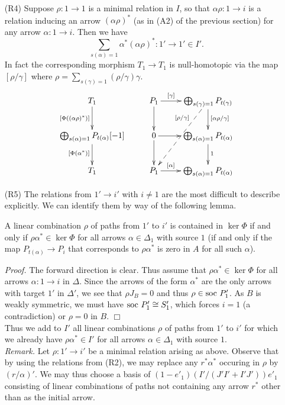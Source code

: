 \documentclass{amsart}
\begin{document}
\begin{itemize}
\vspace{2mm}
\item[(R4)] Suppose $\rho: 1 \rightarrow 1$ is a minimal relation in $I$, so that $\alpha \rho : 1 \rightarrow i$ is a relation inducing an arrow $(\alpha \rho)^*$ (as in (A2) of the previous section) for any arrow $\alpha : 1 \rightarrow i$.  Then we have $$\sum_{s(\alpha)=1} \alpha^*(\alpha \rho)^* : 1' \rightarrow 1'  \in I'.$$  In fact the corresponding morphism $T_1 \rightarrow T_1$ is null-homotopic via the map $[\rho/\gamma]$ where $\rho = \sum_{s(\gamma)=1} (\rho/\gamma) \gamma$.
$$\xymatrix{T_1 \ar[d]_{[\Phi((\alpha \rho)^*)]} & P_1 \ar[r]^-{[\gamma]} \ar[d] & \bigoplus_{s(\gamma)=1} P_{t(\gamma)} \ar[d]^{[\alpha \rho / \gamma]} \ar@{-->}[ddl]_(.3){[\rho/\gamma]} \\ \bigoplus_{s(\alpha)=1} P_{t(\alpha)}[-1] \ar[d]_{[\Phi(\alpha^*)]} & 0 \ar[r] \ar[d] & \bigoplus_{s(\alpha)=1} P_{t(\alpha)} \ar[d]^{1} \\ T_1 & P_1 \ar[r]^-{[\alpha]} & \bigoplus_{s(\alpha)=1} P_{t(\alpha)}}$$

\vspace{2mm}
\item[(R5)] The relations from $1' \rightarrow i'$ with $i \neq 1$ are the most difficult to describe explicitly.  We can identify them by way of the following lemma.
\begin{lemma} A linear combination $\rho$ of paths from $1'$ to $i'$ is contained in $\ker \Phi$ if and only if $\rho \alpha^* \in \ker \Phi$ for all arrows $\alpha \in \Delta_1$ with source $1$ (if and only if the map $P_{t(\alpha)} \rightarrow P_i$ that corresponds to $\rho \alpha^*$ is zero in $A$ for all such $\alpha$).
\end{lemma}

\noindent
{\it Proof.}  The forward direction is clear.  Thus assume that $\rho\alpha^* \in \ker \Phi$ for all arrows $\alpha : 1 \rightarrow i$ in $\Delta$.  Since the arrows of the form $\alpha^*$ are the only arrows with target $1'$ in $\Delta'$, we see that $\rho J_B = 0$ and thus $\rho \in \mathrm{soc}\ P'_1$.  As $B$ is weakly symmetric, we must have $\mathrm{soc}\ P'_1 \cong S'_1$, which forces $i = 1$ (a contradiction) or $\rho = 0$ in $B$. $\Box$ \\

\noindent
Thus we add to $I'$ all linear combinations $\rho$ of paths from $1'$ to $i'$ for which we already have $\rho \alpha^* \in I'$ for all arrows $\alpha \in \Delta_1$ with source $1$. \\

\noindent
{\it Remark.}  Let $\rho : 1' \rightarrow i'$ be a minimal relation arising as above.  Observe that by using the relations from (R2), we may replace any $r^*\alpha^*$ occuring in $\rho$ by $(r/\alpha)'$.  We may thus choose a basis of $(1-e'_1)(I'/(J'I'+I'J'))e'_1$ consisting of linear combinations of paths not containing any arrow $r^*$ other than as the initial arrow.
\end{itemize}
\end{document}
